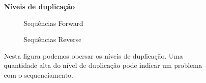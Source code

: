 {\begin{landscape}
\begin{figure}
\centering
\Large\textbf{Níveis de duplicação}\par\medskip
\begin{subfigure}{.7\textwidth}
  \centering
  \caption{Sequências Forward}
\end{subfigure}%
\begin{subfigure}{.7\textwidth}
  \centering
  \caption{Sequências Reverse}
\end{subfigure}
\caption[Níveis de duplicação]{Nesta figura podemos obersar os níveis de duplicação. Uma quantidade alta do nível de duplicação pode indicar um problema com o sequenciamento.}
\label{fig:duplication_levels}
\end{figure}


\end{landscape}}
